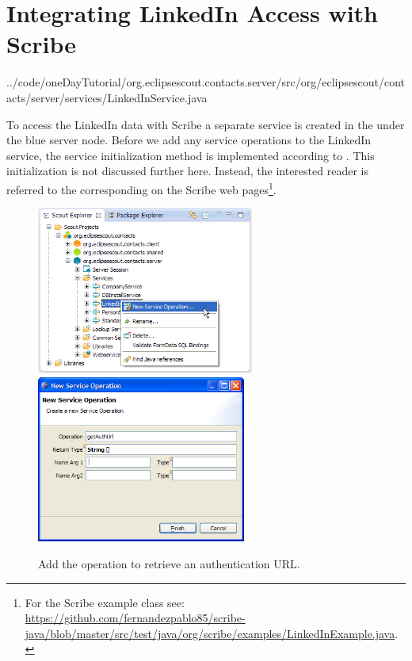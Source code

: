 \documentclass[a4paper,10pt,twoside]{book}
\begin{document}
\section{Integrating LinkedIn Access with Scribe}


{../code/oneDayTutorial/org.eclipsescout.contacts.server/src/org/eclipsescout/contacts/server/services/LinkedInService.java}

To access the LinkedIn data with Scribe a separate service  is created in the  under the blue server node. 
Before we add any service operations to the LinkedIn service, the service initialization method is implemented according to . 
This initialization is not discussed further here.
Instead, the interested reader is referred to the corresponding  on the Scribe web pages\footnote{
For the Scribe  example class see: \url{https://github.com/fernandezpablo85/scribe-java/blob/master/src/test/java/org/scribe/examples/LinkedInExample.java}.
}.

\begin{figure}
\includegraphics[height=5.5cm]{new_operation_authurl_contextmenu.png} \hspace{5mm}
\includegraphics[height=5.5cm]{new_operation_authurl.png}
\caption{Add the operation to retrieve an authentication URL.}
\end{figure}
\end{document}
